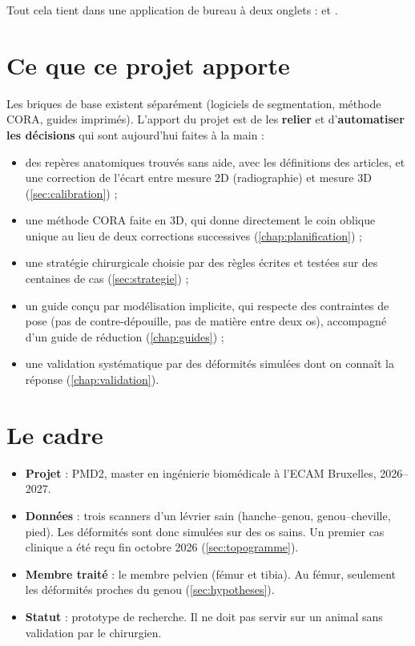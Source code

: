 Tout cela tient dans une application de bureau à deux onglets :  et .

\section{Ce que ce projet apporte}

Les briques de base existent séparément (logiciels de segmentation, méthode CORA, guides imprimés). L'apport du projet
est de les \textbf{relier} et d'\textbf{automatiser les décisions} qui sont aujourd'hui faites à la main :
\begin{itemize}
  \item des repères anatomiques trouvés sans aide, avec les définitions des articles, et une correction de
  l'écart entre mesure 2D (radiographie) et mesure 3D (\cref{sec:calibration}) ;
  \item une méthode CORA faite en 3D, qui donne directement le coin oblique unique au lieu de deux corrections
  successives (\cref{chap:planification}) ;
  \item une stratégie chirurgicale choisie par des règles écrites et testées sur des centaines de cas
  (\cref{sec:strategie}) ;
  \item un guide conçu par modélisation implicite, qui respecte des contraintes de pose (pas de contre-dépouille, pas
  de matière entre deux os), accompagné d'un guide de réduction (\cref{chap:guides}) ;
  \item une validation systématique par des déformités simulées dont on connaît la réponse
  (\cref{chap:validation}).
\end{itemize}

\section{Le cadre}

\begin{itemize}
  \item \textbf{Projet} : PMD2, master en ingénierie biomédicale à l'ECAM Bruxelles, 2026--2027.
  \item \textbf{Données} : trois scanners d'un lévrier sain (hanche--genou, genou--cheville, pied). Les déformités
  sont donc simulées sur des os sains. Un premier cas clinique a été reçu fin octobre 2026 (\cref{sec:topogramme}).
  \item \textbf{Membre traité} : le membre pelvien (fémur et tibia). Au fémur, seulement les déformités proches du
  genou (\cref{sec:hypotheses}).
  \item \textbf{Statut} : prototype de recherche. Il ne doit pas servir sur un animal sans validation par le
  chirurgien.
\end{itemize}

